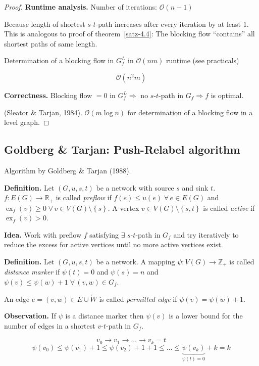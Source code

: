 \documentclass[a4paper]{article}
\theoremstyle{definition}
\newcommand{\set}[1]{\left\{#1\right\}}
\newcommand{\gath}[2]{$#1$-$#2$-path} %
\newcommand{\fall}{\;\forall\,}
\begin{document}
\begin{proof}
  \textbf{Runtime analysis.}
  Number of iterations: $\mathcal{O}(n-1)$

  Because length of shortest \gath st increases after every iteration by at least 1.
  This is analogous to proof of theorem~\ref{satz-4.4}: The blocking flow ``contains'' all
  shortest paths of same length.

  Determination of a blocking flow in $G^L_f$ in $\mathcal{O}(nm)$ runtime (see practicals)

  \[
    \mathcal{O}(n^2 m)
  \]

  \textbf{Correctness.}
  Blocking flow $=0$ in $G^L_f \Rightarrow$ no \gath st in $G_f \Rightarrow f$ is optimal.

  (Sleator \& Tarjan, 1984).
    $\mathcal{O}(m \log{n})$ for determination of a blocking flow in a level graph.
\end{proof}

\subsection{Goldberg \& Tarjan: Push-Relabel algorithm}
%
Algorithm by Goldberg \& Tarjan (1988).

\textbf{Definition.}
  Let $(G, u, s, t)$ be a network with source $s$ and sink $t$.
  $f: E(G) \rightarrow \mathbb{R}_+$ is called \emph{preflow} if $f(e) \leq u(e) \fall e \in E(G)$
  and $\operatorname{ex}_f(v) \geq 0 \fall v \in V(G) \setminus \set{s}$.
  A vertex $v \in V(G) \setminus \set{s, t}$ is called \emph{active} if $\operatorname{ex}_f(v) > 0$.

\textbf{Idea.}
  Work with preflow $f$ satisfying $\exists$ \gath st in $G_f$ and try iteratively to reduce the excess for active vertices until no more active vertices exist.

\textbf{Definition.}
  Let $(G, u, s, t)$ be a network. A mapping $\psi: V(G) \rightarrow \mathbb{Z}_+$ is called \emph{distance marker} if $\psi(t) = 0$ and $\psi(s) = n$ and $\psi(v) \leq \psi(w) + 1 \fall (v, w) \in G_f$.

An edge $e = (v, w) \in E \cup \overleftarrow{W}$ is called \emph{permitted edge} if $\psi(v) = \psi(w) + 1$.

\textbf{Observation.}
  If $\psi$ is a distance marker then $\psi(v)$ is a lower bound for the number of edges in a shortest \gath vt in $G_f$.

  \[ v_0 \rightarrow v_1 \rightarrow \dots \rightarrow v_k=t \]
  \[
    \psi(v_0) \leq \psi(v_1) + 1
      \leq \psi(v_2) + 1 + 1
      \leq \ldots
      \leq \underbrace{\psi(v_k)}_{\psi(t) = 0} + k = k
  \]
\end{document}
